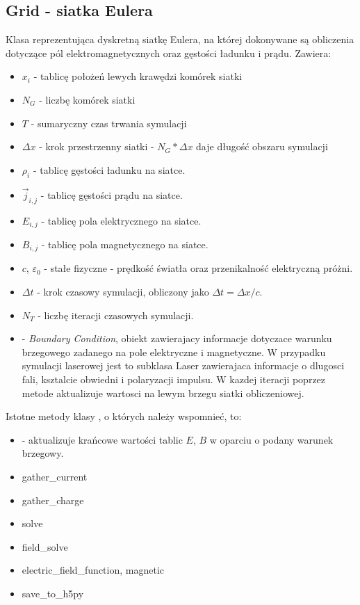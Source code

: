 \subsection{Grid - siatka Eulera}
Klasa reprezentująca dyskretną siatkę Eulera, na której dokonywane są
obliczenia dotyczące pól elektromagnetycznych oraz gęstości ładunku i
prądu.  Zawiera:
\begin{itemize}
    \item $x_i$ - tablicę położeń lewych krawędzi komórek siatki
    \item $N_G$ - liczbę komórek siatki
    \item $T$ - sumaryczny czas trwania symulacji
    \item $\Delta x$ - krok przestrzenny siatki - $N_G * \Delta x$ daje
        długość obszaru symulacji
    \item $\rho_i$ - tablicę gęstości ładunku na siatce.
    \item $\vec{j}_{i,j}$ - tablicę gęstości prądu na siatce.
    \item $E_{i,j}$ - tablicę pola elektrycznego na siatce.
    \item $B_{i,j}$ - tablicę pola magnetycznego na siatce.
    \item $c$, $\varepsilon_0$ - stałe fizyczne - prędkość światła oraz
        przenikalność elektryczną próżni.
    \item $\Delta t$ - krok czasowy symulacji, obliczony jako $\Delta t =
        \Delta x / c$.
    \item $N_T$ - liczbę iteracji czasowych symulacji.
    \item {} - \emph{Boundary Condition}, obiekt zawierajacy informacje dotyczace
        warunku brzegowego zadanego na pole elektryczne i magnetyczne. W przypadku symulacji
        laserowej jest to subklasa Laser zawierajaca informacje o dlugosci fali, ksztalcie obwiedni
        i polaryzacji impulsu. W kazdej iteracji  poprzez metode
         aktualizuje wartosci na lewym brzegu siatki obliczeniowej.
\end{itemize}

Istotne metody klasy , o których należy wspomnieć, to:
\begin{itemize}
     \item {} - aktualizuje krańcowe wartości tablic $E$, $B$
         w oparciu o podany warunek brzegowy.
     \item gather\_current 
     \item gather\_charge
     \item solve
     \item field\_solve
     \item electric\_field\_function, magnetic
     \item save\_to\_h5py
\end{itemize}

